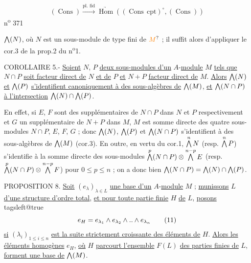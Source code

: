 \[
 (\operatorname{Cons})\xrightarrow{\text{pl. fid}}\underrightarrow{\operatorname{Hom}}((\operatorname{Cons}\,\mathrm{cpt})^\circ,(\operatorname{Cons}))
\]
n\textsuperscript{o} 371

$\bigwedge(N)$, où $N$ est un sous-module de type fini de $\unsure{M}$ ; il suffit alors d'appliquer le cor.3 de la prop.2 du n\textsuperscript{o}1.

COROLLAIRE 5.- \uline{Soient} $N$, $P$ \uline{deux sous-modules d'un} $A$-\uline{module} $M$ \uline{tels que} $N\cap P$ \uline{soit facteur direct de} $N$ \uline{et de} $P$ \uline{et} $N+P$ \uline{facteur direct de} $M$. \uline{Alors} $\bigwedge(N)$ \uline{et} $\bigwedge(P)$ \uline{s'identifient canoniquement à des sous-algèbres de} $\bigwedge(M)$, \uline{et} $\bigwedge(N\cap P)$ \uline{à l'intersection} $\bigwedge(N)\cap \bigwedge(P)$.

En effet, si $E$, $F$ sont des supplémentaires de $N\cap P$ dans $N$ et $P$ respectivement et $G$ un supplémentaire de $N+P$ dans $M$, $M$ est somme directe des quatre sous-modules $N\cap P$, $E$, $F$, $G$ ; donc $\bigwedge(N)$, $\bigwedge(P)$ et $\bigwedge(N\cap P)$ s'identifient à des sous-algèbres de $\bigwedge(M)$ (cor.3). En outre, en vertu du cor.1, $\overset{n}{\bigwedge}\,N$ (resp. $\overset{n}{\bigwedge}\,P$) s'identifie à la somme directe des sous-modules $\overset{p}{\bigwedge}(N\cap P)\otimes\overset{n-p}{\bigwedge}\,E$ (resp. $\overset{p}{\bigwedge}(N\cap P)\otimes\overset{n-p}{\bigwedge}\,F$) pour $0\leq p\leq n$ ; on a donc bien $\bigwedge(N\cap P)=\bigwedge(N)\cap \bigwedge(P)$.

PROPOSITION 8.\unsure{=|-} \uline{Soit} $(e_{\lambda})_{\lambda\in L}$ \uline{une base d'un} $A$-\uline{module} $M$ ; \uline{munissons} $L$ \uline{d'une structure d'ordre total}, \uline{et pour toute partie finie} $H$ \uline{de} $L$, \uline{posons}
\begingroup\csname tagsleft@true\endcsname
\[
 e_H=e_{\lambda_1}\wedge e_{\lambda_2}\wedge\mathord{..}\wedge e_{\lambda_n}\tag*{(11)}
\]
\endgroup
\uline{si} $(\lambda_i)_{1\leq i\leq n}$ \uline{est la suite strictement croissante des éléments de} $H$. \uline{Alors les éléments homogènes} $e_H$, \uline{où} $H$ \uline{parcourt l'ensemble} $F(L)$ \uline{des parties finies de} $L$, \uline{forment une base de} $\bigwedge(M)$.

